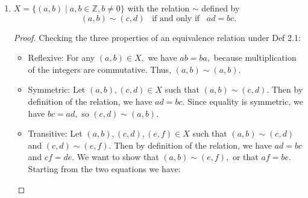 \documentclass[11pt]{article}
\begin{document}
\begin{enumerate}[label=(\alph*)]
\begin{proof}
        Note that to say $y - x$ is divisible by 5 means there exists some $k \in \mathbb{Z}$ such that $y - x = 5k.$ Checking the three properties of an equivalence relation under Def 2.1:
        \begin{itemize}
            \item Reflexive: For any $x\in \mathbb{Z},$ we have $x-x=0.$ Then to check divisibility by 5, we can write $0 = 5k$. The integer $k=0$ satisifies the equation. Thus, $x\sim x.$
            \item Symmetric: If $x\sim y,$ then $y-x$ is divisible by 5. This means there exists some integer $k$ such that $y-x=5k.$ Multiplying both sides by $-1$ gives $x-y=-5k,$ and since the integers are closed under multiplication, $-5k$ is an integer. Thus $x-y$ is divisible by 5 so $x\sim y.$ 
            \item Transitive: If $x\sim y$ and $y\sim z,$ then there exist integers $k_1$ and $k_2$ such that $y-x=5k_1$ and $z-y=5k_2.$ Adding these two equations gives us:
            \[
            (y-x) + (z-y) = 5k_1 + 5k_2 \implies z - x = 5(k_1 + k_2).
            \]
            Since the integers are closed under addition, $k_1 + k_2$ is an integer. This shows that $z - x$ is divisible by 5, so $x\sim z.$
        \end{itemize}
        Since this relation satisfies all three properties, it is an equivalence relation.
    \end{proof}
    \item $X=\{(a,b)\mid a,b\in \mathbb{Z}, b\neq 0\}$ with the relation $\sim$ defined by
$$(a,b)\sim (c,d)\hspace{10pt}\mbox{if and only if}\hspace{10pt}ad=bc.$$
    \begin{proof}
        Checking the three properties of an equivalence relation under Def 2.1:
        \begin{itemize}
            \item Reflexive: For any $(a,b)\in X,$ we have $ab=ba,$ because multiplication of the integers are commutative. Thus, $(a,b)\sim (a,b).$
            \item Symmetric: Let $(a,b), (c,d) \in X$ such that $(a,b) \sim (c,d).$ Then by definition of the relation, we have $ad = bc.$ Since equality is symmetric, we have $bc = ad,$ so $(c,d) \sim (a,b).$
            \item Transitive: Let $(a,b), (c,d), (e,f) \in X$ such that $(a,b) \sim (c,d)$ and $(c,d) \sim (e,f).$ Then by definition of the relation, we have $ad = bc$ and $cf = de.$ We want to show that $(a,b) \sim (e,f),$ or that $af = be.$ Starting from the two equations we have:

\end{itemize}
\end{proof}
\end{enumerate}
\end{document}
